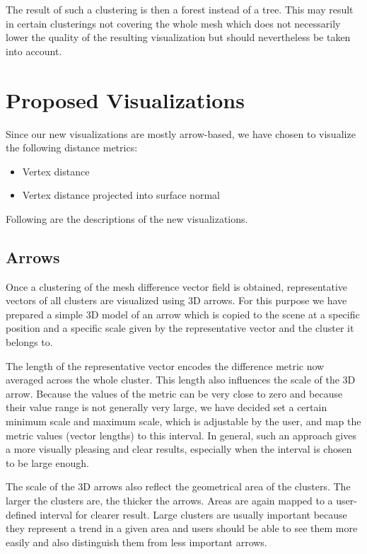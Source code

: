 The result of such a clustering is then a forest instead of a tree. This may result in certain clusterings not covering the whole mesh which does not necessarily lower the quality of the resulting visualization but should nevertheless be taken into account.
\section{Proposed Visualizations}

Since our new visualizations are mostly arrow-based, we have chosen to visualize the following distance metrics:

\begin{itemize}
\item Vertex distance
\item Vertex distance projected into surface normal
\end{itemize}

Following are the descriptions of the new visualizations.

\subsection{Arrows}

Once a clustering of the mesh difference vector field is obtained, representative vectors of all clusters are visualized using 3D arrows. For this purpose we have prepared a simple 3D model of an arrow which is copied to the scene at a specific position and a specific scale given by the representative vector and the cluster it belongs to.

The length of the representative vector encodes the difference metric now averaged across the whole cluster. This length also influences the scale of the 3D arrow. Because the values of the metric can be very close to zero and because their value range is not generally very large, we have decided set a certain minimum scale and maximum scale, which is adjustable by the user, and map the metric values (vector lengths) to this interval. In general, such an approach gives a more visually pleasing and clear results, especially when the interval is chosen to be large enough.

The scale of the 3D arrows also reflect the geometrical area of the clusters. The larger the clusters are, the thicker the arrows. Areas are again mapped to a user-defined interval for clearer result. Large clusters are usually important because they represent a trend in a given area and users should be able to see them more easily and also distinguish them from less important arrows.

